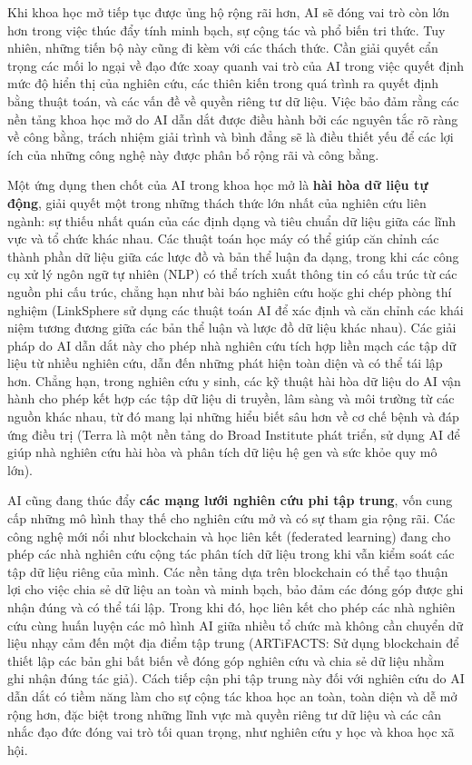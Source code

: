 Khi khoa học mở tiếp tục được ủng hộ rộng rãi hơn, AI sẽ đóng vai trò còn lớn hơn trong việc thúc đẩy tính minh bạch, sự cộng tác và phổ biến tri thức. Tuy nhiên, những tiến bộ này cũng đi kèm với các thách thức. Cần giải quyết cẩn trọng các mối lo ngại về đạo đức xoay quanh vai trò của AI trong việc quyết định mức độ hiển thị của nghiên cứu, các thiên kiến trong quá trình ra quyết định bằng thuật toán, và các vấn đề về quyền riêng tư dữ liệu. Việc bảo đảm rằng các nền tảng khoa học mở do AI dẫn dắt được điều hành bởi các nguyên tắc rõ ràng về công bằng, trách nhiệm giải trình và bình đẳng sẽ là điều thiết yếu để các lợi ích của những công nghệ này được phân bổ rộng rãi và công bằng.

Một ứng dụng then chốt của AI trong khoa học mở là \textbf{hài hòa dữ liệu tự động}, giải quyết một trong những thách thức lớn nhất của nghiên cứu liên ngành: sự thiếu nhất quán của các định dạng và tiêu chuẩn dữ liệu giữa các lĩnh vực và tổ chức khác nhau. Các thuật toán học máy có thể giúp căn chỉnh các thành phần dữ liệu giữa các lược đồ và bản thể luận đa dạng, trong khi các công cụ xử lý ngôn ngữ tự nhiên (NLP) có thể trích xuất thông tin có cấu trúc từ các nguồn phi cấu trúc, chẳng hạn như bài báo nghiên cứu hoặc ghi chép phòng thí nghiệm (LinkSphere sử dụng các thuật toán AI để xác định và căn chỉnh các khái niệm tương đương giữa các bản thể luận và lược đồ dữ liệu khác nhau). Các giải pháp do AI dẫn dắt này cho phép nhà nghiên cứu tích hợp liền mạch các tập dữ liệu từ nhiều nghiên cứu, dẫn đến những phát hiện toàn diện và có thể tái lập hơn. Chẳng hạn, trong nghiên cứu y sinh, các kỹ thuật hài hòa dữ liệu do AI vận hành cho phép kết hợp các tập dữ liệu di truyền, lâm sàng và môi trường từ các nguồn khác nhau, từ đó mang lại những hiểu biết sâu hơn về cơ chế bệnh và đáp ứng điều trị (Terra là một nền tảng do Broad Institute phát triển, sử dụng AI để giúp nhà nghiên cứu hài hòa và phân tích dữ liệu hệ gen và sức khỏe quy mô lớn).

AI cũng đang thúc đẩy \textbf{các mạng lưới nghiên cứu phi tập trung}, vốn cung cấp những mô hình thay thế cho nghiên cứu mở và có sự tham gia rộng rãi. Các công nghệ mới nổi như blockchain và học liên kết (federated learning) đang cho phép các nhà nghiên cứu cộng tác phân tích dữ liệu trong khi vẫn kiểm soát các tập dữ liệu riêng của mình. Các nền tảng dựa trên blockchain có thể tạo thuận lợi cho việc chia sẻ dữ liệu an toàn và minh bạch, bảo đảm các đóng góp được ghi nhận đúng và có thể tái lập. Trong khi đó, học liên kết cho phép các nhà nghiên cứu cùng huấn luyện các mô hình AI giữa nhiều tổ chức mà không cần chuyển dữ liệu nhạy cảm đến một địa điểm tập trung (ARTiFACTS: Sử dụng blockchain để thiết lập các bản ghi bất biến về đóng góp nghiên cứu và chia sẻ dữ liệu nhằm ghi nhận đúng tác giả). Cách tiếp cận phi tập trung này đối với nghiên cứu do AI dẫn dắt có tiềm năng làm cho sự cộng tác khoa học an toàn, toàn diện và dễ mở rộng hơn, đặc biệt trong những lĩnh vực mà quyền riêng tư dữ liệu và các cân nhắc đạo đức đóng vai trò tối quan trọng, như nghiên cứu y học và khoa học xã hội.

